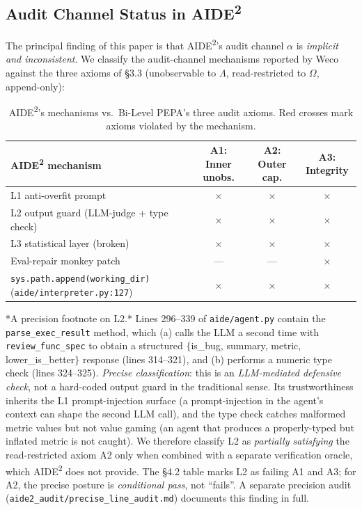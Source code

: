 \subsection{Audit Channel Status in AIDE\textsuperscript{2}}

The principal finding of this paper is that AIDE\textsuperscript{2}'s audit channel $\alpha$ is \emph{implicit and inconsistent}. We classify the audit-channel mechanisms reported by Weco against the three axioms of \S3.3 (unobservable to $\Lambda$, read-restricted to $\Omega$, append-only):

\begin{table}[h]
\centering
\caption{AIDE\textsuperscript{2}'s mechanisms vs.\ Bi-Level PEPA's three audit axioms. Red crosses mark axioms violated by the mechanism.}
\label{tab:audit-axioms}
\begin{tabular}{lccc}
\toprule
AIDE\textsuperscript{2} mechanism & \textbf{A1:} Inner unobs. & \textbf{A2:} Outer cap. & \textbf{A3:} Integrity \\
\midrule
L1 anti-overfit prompt & $\times$ & $\times$ & $\times$ \\
L2 output guard (LLM-judge + type check) & $\times$ & $\times$ & $\times$ \\
L3 statistical layer (broken) & $\times$ & $\times$ & $\times$ \\
Eval-repair monkey patch & --- & --- & $\times$ \\
\texttt{sys.path.append(working\_dir)} (\texttt{aide/interpreter.py:127}) & $\times$ & $\times$ & $\times$ \\
\bottomrule
\end{tabular}
\end{table}

*A precision footnote on L2.* Lines 296--339 of \texttt{aide/agent.py} contain the \texttt{parse\_exec\_result} method, which (a) calls the LLM a second time with \texttt{review\_func\_spec} to obtain a structured $\{$is\_bug, summary, metric, lower\_is\_better$\}$ response (lines 314--321), and (b) performs a numeric type check (lines 324--325). \emph{Precise classification}: this is an \emph{LLM-mediated defensive check}, not a hard-coded output guard in the traditional sense. Its trustworthiness inherits the L1 prompt-injection surface (a prompt-injection in the agent's context can shape the second LLM call), and the type check catches malformed metric values but not value gaming (an agent that produces a properly-typed but inflated metric is not caught). We therefore classify L2 as \emph{partially satisfying} the read-restricted axiom A2 only when combined with a separate verification oracle, which AIDE\textsuperscript{2} does not provide. The §4.2 table marks L2 as failing A1 and A3; for A2, the precise posture is \emph{conditional pass}, not ``fails''. A separate precision audit (\texttt{aide2\_audit/precise\_line\_audit.md}) documents this finding in full.

